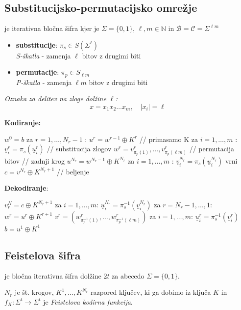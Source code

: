 \begin{multicols}{5}
\subsection*{Substitucijsko-permutacijsko omrežje}
je iterativna bločna šifra kjer je $\Sigma = \{0,1\}$, $\ell, m \in \mathbb{N}$ in $\mathcal{B} = \mathcal{C} = \Sigma^{\ell m}$

\begin{itemize}
	\item \textbf{substitucije}: $\pi_s \in S(\Sigma^\ell)$ \\
	\textit{S-škatla} - zamenja $\ell$ bitov z drugimi biti
	\item \textbf{permutacije}: $\pi_p \in S_{\ell m}$ \\
	\textit{P-škatla} - zamenja $\ell m$ bitov z drugimi biti
\end{itemize}

\textit{Oznaka za delitev na zloge dolžine $\ell$:}
\[ x = x_1 x_2 \dots x_m, \quad |x_i| = \ell \]

\textbf{Kodiranje:}
\begin{koda}
$w^0 = b$
za $r = 1, \dots, N_r - 1$ :
	$u^r = w^{r-1} \oplus K^r$ // primasamo K
	za $i = 1, \dots, m$ :
		$\underline{v}_i^r = \pi_s(\underline{u}_i^r)$ // substitucija zlogov
	$w^r = v_{\pi_p(1)}^r, \dots, v_{\pi_p(\ell m)}^r$ // permutacija bitov
// zadnji krog
$u^{N_r} = w^{N_r - 1} \oplus K^{N_r}$
za $ i = 1, \dots, m$ :
	$\underline{v}_i^{N_r} = \pi_s(\underline{u}_i^{N_r})$
vrni $c = v^{N_r} \oplus K^{N_r + 1}$  // beljenje
\end{koda}

\textbf{Dekodiranje}:
\begin{koda}
$v^N_r = c \oplus K^{N_r + 1}$
za $ i = 1, \dots, m$:
	$\underline{u}_i^{N_r} = \pi_s^{-1}(\underline{v}_i^{N_r})$
za $ r = N_r - 1, \dots, 1$:
	$w^r = u^r \oplus K^{r+1}$
	$v^r = (w_{\pi_p^{-1}(1)}^r, \dots, w_{\pi_p^{-1}(\ell m)}^r)$
	za $ i = 1, \dots, m$:
		$\underline{u}^r_i = \pi_s^{-1}(\underline{v}_i^r)$
$b = u^1 \oplus K^1$
\end{koda}

\subsection*{Feistelova šifra}
je bločna iterativna šifra dolžine $2t$ za abecedo $\Sigma = \{0, 1\}$.

$N_r$ je št. krogov, $K^1, \dots, K^{N_r}$ razpored ključev, ki ga dobimo iz ključa
$K$ in $f_K: \Sigma^t \to \Sigma^t$ je \textit{Feistelova kodirna funkcija}.


\end{multicols}
